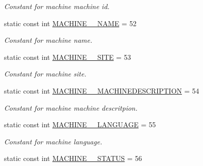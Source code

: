 \begin{DoxyCompactItemize}
\begin{DoxyCompactList}\small\item\em Constant for machine machine id. \item\end{DoxyCompactList}\item 
\hypertarget{classUMS__Data_1_1UMS__DataPackage_a709e9131404d168e154a3155b55ec1d5}{
static const int \hyperlink{classUMS__Data_1_1UMS__DataPackage_a709e9131404d168e154a3155b55ec1d5}{MACHINE\_\-\_\-NAME} = 52}
\label{classUMS__Data_1_1UMS__DataPackage_a709e9131404d168e154a3155b55ec1d5}

\begin{DoxyCompactList}\small\item\em Constant for machine name. \item\end{DoxyCompactList}\item 
\hypertarget{classUMS__Data_1_1UMS__DataPackage_ab523a3b17f4a08d408d1b61e1726c60c}{
static const int \hyperlink{classUMS__Data_1_1UMS__DataPackage_ab523a3b17f4a08d408d1b61e1726c60c}{MACHINE\_\-\_\-SITE} = 53}
\label{classUMS__Data_1_1UMS__DataPackage_ab523a3b17f4a08d408d1b61e1726c60c}

\begin{DoxyCompactList}\small\item\em Constant for machine site. \item\end{DoxyCompactList}\item 
\hypertarget{classUMS__Data_1_1UMS__DataPackage_a7cda61ff5d9dece8afad4d16776e51de}{
static const int \hyperlink{classUMS__Data_1_1UMS__DataPackage_a7cda61ff5d9dece8afad4d16776e51de}{MACHINE\_\-\_\-MACHINEDESCRIPTION} = 54}
\label{classUMS__Data_1_1UMS__DataPackage_a7cda61ff5d9dece8afad4d16776e51de}

\begin{DoxyCompactList}\small\item\em Constant for machine machine descritpion. \item\end{DoxyCompactList}\item 
\hypertarget{classUMS__Data_1_1UMS__DataPackage_a74d6532b8aac13673a93c73aa7936c69}{
static const int \hyperlink{classUMS__Data_1_1UMS__DataPackage_a74d6532b8aac13673a93c73aa7936c69}{MACHINE\_\-\_\-LANGUAGE} = 55}
\label{classUMS__Data_1_1UMS__DataPackage_a74d6532b8aac13673a93c73aa7936c69}

\begin{DoxyCompactList}\small\item\em Constant for machine language. \item\end{DoxyCompactList}\item 
\hypertarget{classUMS__Data_1_1UMS__DataPackage_ab1c32da746e1d9ae4ab7d11edfe52365}{
static const int \hyperlink{classUMS__Data_1_1UMS__DataPackage_ab1c32da746e1d9ae4ab7d11edfe52365}{MACHINE\_\-\_\-STATUS} = 56}
\label{classUMS__Data_1_1UMS__DataPackage_ab1c32da746e1d9ae4ab7d11edfe52365}


\end{DoxyCompactItemize}
